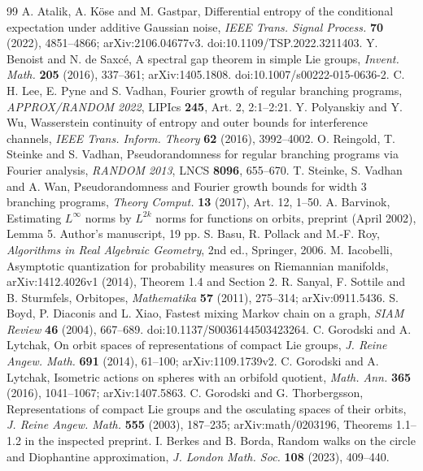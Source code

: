 \begin{thebibliography}{99}
 A. Atalik, A. K\"ose and M. Gastpar,
Differential entropy of the conditional expectation under additive Gaussian noise,
\emph{IEEE Trans. Signal Process.} \textbf{70} (2022), 4851--4866;
arXiv:2106.04677v3. doi:10.1109/TSP.2022.3211403.
 Y. Benoist and N. de Saxc\'e,
A spectral gap theorem in simple Lie groups,
\emph{Invent. Math.} \textbf{205} (2016), 337--361;
arXiv:1405.1808. doi:10.1007/s00222-015-0636-2.
 C. H. Lee, E. Pyne and S. Vadhan,
Fourier growth of regular branching programs,
\emph{APPROX/RANDOM 2022}, LIPIcs \textbf{245}, Art. 2, 2:1--2:21.
 Y. Polyanskiy and Y. Wu,
Wasserstein continuity of entropy and outer bounds for interference channels,
\emph{IEEE Trans. Inform. Theory} \textbf{62} (2016), 3992--4002.
 O. Reingold, T. Steinke and S. Vadhan,
Pseudorandomness for regular branching programs via Fourier analysis,
\emph{RANDOM 2013}, LNCS \textbf{8096}, 655--670.
 T. Steinke, S. Vadhan and A. Wan,
Pseudorandomness and Fourier growth bounds for width 3 branching programs,
\emph{Theory Comput.} \textbf{13} (2017), Art. 12, 1--50.
 A. Barvinok,
Estimating $L^\infty$ norms by $L^{2k}$ norms for functions on orbits,
preprint (April 2002), Lemma 5. Author's manuscript, 19 pp.
 S. Basu, R. Pollack and M.-F. Roy,
\emph{Algorithms in Real Algebraic Geometry}, 2nd ed., Springer, 2006.
 M. Iacobelli,
Asymptotic quantization for probability measures on Riemannian manifolds,
arXiv:1412.4026v1 (2014), Theorem 1.4 and Section 2.
 R. Sanyal, F. Sottile and B. Sturmfels,
Orbitopes, \emph{Mathematika} \textbf{57} (2011), 275--314;
arXiv:0911.5436.
 S. Boyd, P. Diaconis and L. Xiao,
Fastest mixing Markov chain on a graph,
\emph{SIAM Review} \textbf{46} (2004), 667--689.
doi:10.1137/S0036144503423264.
 C. Gorodski and A. Lytchak,
On orbit spaces of representations of compact Lie groups,
\emph{J. Reine Angew. Math.} \textbf{691} (2014), 61--100;
arXiv:1109.1739v2.
 C. Gorodski and A. Lytchak,
Isometric actions on spheres with an orbifold quotient,
\emph{Math. Ann.} \textbf{365} (2016), 1041--1067;
arXiv:1407.5863.
 C. Gorodski and G. Thorbergsson,
Representations of compact Lie groups and the osculating spaces of their orbits,
\emph{J. Reine Angew. Math.} \textbf{555} (2003), 187--235;
arXiv:math/0203196, Theorems 1.1--1.2 in the inspected preprint.
 I. Berkes and B. Borda,
Random walks on the circle and Diophantine approximation,
\emph{J. London Math. Soc.} \textbf{108} (2023), 409--440.
\end{thebibliography}
